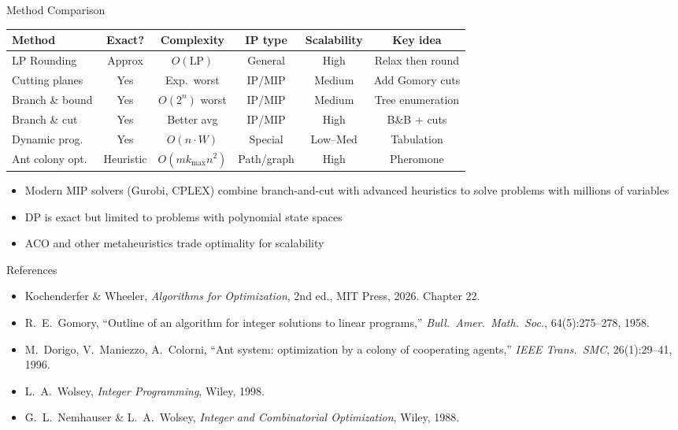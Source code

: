 \documentclass[aspectratio=169,10pt]{beamer}
\begin{document}
\begin{frame}{Method Comparison}
  \begin{center}
    \renewcommand{\arraystretch}{1.4}
    \begin{tabular}{lccccc}
      \toprule
      \textbf{Method} & \textbf{Exact?} & \textbf{Complexity} &
        \textbf{IP type} & \textbf{Scalability} & \textbf{Key idea} \\
      \midrule
      LP Rounding & Approx & $O(\text{LP})$ & General & High & Relax then round \\
      Cutting planes & Yes & Exp.\ worst & IP/MIP & Medium & Add Gomory cuts \\
      Branch \& bound & Yes & $O(2^n)$ worst & IP/MIP & Medium & Tree enumeration \\
      Branch \& cut & Yes & Better avg & IP/MIP & High & B\&B + cuts \\
      Dynamic prog. & Yes & $O(n \cdot W)$ & Special & Low--Med & Tabulation \\
      Ant colony opt. & Heuristic & $O(mk_{\max}n^2)$ & Path/graph & High & Pheromone \\
      \bottomrule
    \end{tabular}
  \end{center}

  \vspace{4pt}
  \begin{itemize}
    \item Modern MIP solvers (Gurobi, CPLEX) combine branch-and-cut with
          advanced heuristics to solve problems with millions of variables
    \item DP is exact but limited to problems with polynomial state spaces
    \item ACO and other metaheuristics trade optimality for scalability
  \end{itemize}
\end{frame}

\begin{frame}{References}
  \begin{itemize}
    \item Kochenderfer \& Wheeler, \textit{Algorithms for Optimization},
          2nd ed., MIT Press, 2026.  Chapter 22.
    \item R.\ E.\ Gomory, ``Outline of an algorithm for integer solutions
          to linear programs,'' \textit{Bull.\ Amer.\ Math.\ Soc.},
          64(5):275--278, 1958.
    \item M.\ Dorigo, V.\ Maniezzo, A.\ Colorni, ``Ant system: optimization
          by a colony of cooperating agents,''
          \textit{IEEE Trans.\ SMC}, 26(1):29--41, 1996.
    \item L.\ A.\ Wolsey, \textit{Integer Programming}, Wiley, 1998.
    \item G.\ L.\ Nemhauser \& L.\ A.\ Wolsey,
          \textit{Integer and Combinatorial Optimization}, Wiley, 1988.
  \end{itemize}
\end{frame}
\end{document}
